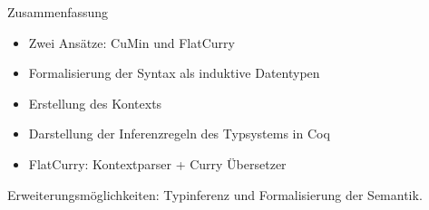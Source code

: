 \documentclass{beamer}
\begin{document}
\begin{frame}{Zusammenfassung}
\begin{itemize}
	\item Zwei Ansätze: CuMin und FlatCurry
	\item Formalisierung der Syntax als induktive Datentypen
	\item Erstellung des Kontexts
	\item Darstellung der Inferenzregeln des Typsystems in Coq
	\item FlatCurry: Kontextparser + Curry Übersetzer
\end{itemize}
Erweiterungsmöglichkeiten: Typinferenz und Formalisierung der Semantik.
\end{frame}
\end{document}
